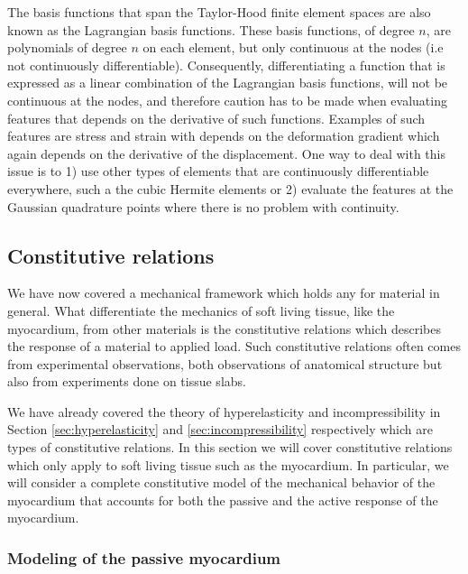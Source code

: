 \begin{remark}
  The basis functions that span the Taylor-Hood
  finite element spaces are also known as the
  Lagrangian basis functions. These basis functions, of
  degree $n$, are polynomials of degree $n$ on each element, but only
  continuous at the nodes (i.e not continuously
  differentiable). Consequently, differentiating a function that is
  expressed as a linear combination of the Lagrangian basis functions,
  will not be continuous at the nodes, and therefore caution has to
  be made when evaluating features that depends on the derivative of
  such functions. Examples of such features are stress and
  strain with depends on the deformation gradient which again depends
  on the derivative of the displacement. One way to deal with this
  issue is to 1) use other types of elements that are continuously
  differentiable everywhere,  such a the cubic Hermite elements or 2) evaluate the features at the
  Gaussian quadrature points where there is no problem with continuity.
\end{remark}


\subsection{Constitutive relations}
\label{sec:constitutive_relations}
We have now covered a mechanical framework which holds any for
material in general. What differentiate the mechanics of soft
living tissue, like the myocardium, from other materials is the
constitutive relations which describes the response of a material to
applied load. Such constitutive relations often comes from
experimental observations, both observations of anatomical structure
but also from experiments done on tissue slabs.

We have already covered the theory of hyperelasticity and incompressibility in Section
\ref{sec:hyperelasticity} and \ref{sec:incompressibility} respectively
which are types of constitutive relations. In this section we will
cover constitutive relations which only apply to soft living tissue
such as the myocardium. In particular, we will consider a complete
constitutive model of the mechanical behavior of the myocardium that
accounts for both the passive and the active response of the myocardium.


\subsubsection{Modeling of the passive myocardium}


